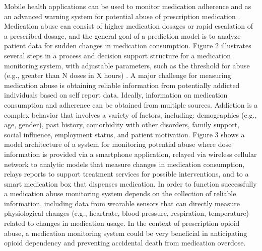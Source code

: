 \documentclass[sigconf]{acmart}
\begin{document}
Mobile health applications can be used to monitor medication adherence and 
as an advanced warning system for potential abuse of prescription medication 
\cite{varshney13}. Medication abuse can consist of higher medication dosages 
or rapid escalation of a prescribed dosage, and the general goal of a prediction 
model is to analyze patient data for sudden changes in medication consumption. 
Figure 2 illustrates several steps in a process and decision support structure 
for a medication monitoring system, with adjustable parameters, such as the 
threshold for abuse (e.g., greater than N doses in X hours) \cite{Varshney14}. 
A major challenge for measuring medication abuse is obtaining reliable 
information from potentially addicted individuals based on self report data. 
Ideally, information on medication consumption and adherence can be obtained 
from multiple sources. Addiction is a complex behavior that involves a variety 
of factors, including: demographics (e.g., age, gender), past history, 
comorbidity with other disorders, family support, social influence, employment 
status, and patient motivation. Figure 3 shows a model architecture of a system 
for monitoring potential abuse where dose information is provided via a 
smartphone application, relayed via wireless cellular network to analytic models 
that measure changes in medication consumption, relays reports to support 
treatment services for possible interventions, and to a smart medication box that 
dispenses medication. In order to function successfully a medication abuse 
monitoring system depends on the collection of reliable information, including 
data from wearable sensors that can directly measure physiological changes 
(e.g., heartrate, blood pressure, respiration, temperature) related to changes 
in medication usage. In the context of prescription opioid abuse, a medication 
monitoring system could be very beneficial in anticipating opioid dependency
and preventing accidental death from medication overdose. 
\end{document}
